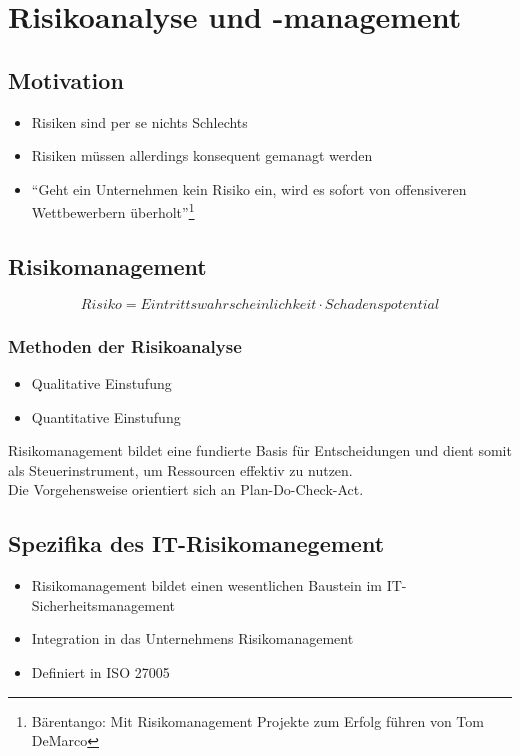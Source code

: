 \section{Risikoanalyse und -management}

\subsection{Motivation}
\begin{itemize}
	\item Risiken sind per se nichts Schlechts
	\item Risiken müssen allerdings konsequent gemanagt werden
	\item "`Geht ein Unternehmen kein Risiko ein, wird es sofort von offensiveren Wettbewerbern überholt"'\footnote{Bärentango: Mit Risikomanagement Projekte zum Erfolg führen von Tom DeMarco}
\end{itemize}


\subsection{Risikomanagement}
\[Risiko = Eintrittswahrscheinlichkeit\cdot Schadenspotential\]

\subsubsection{Methoden der Risikoanalyse}
\begin{itemize}
	\item Qualitative Einstufung
	\item Quantitative Einstufung
\end{itemize}

Risikomanagement bildet eine fundierte Basis für Entscheidungen und dient somit als Steuerinstrument, um Ressourcen effektiv zu nutzen.\\
Die Vorgehensweise orientiert sich an Plan-Do-Check-Act.

\subsection{Spezifika des IT-Risikomanegement}
\begin{itemize}
	\item Risikomanagement bildet einen wesentlichen Baustein im IT-Sicherheitsmanagement
	\item Integration in das Unternehmens Risikomanagement
	\item Definiert in ISO 27005
\end{itemize}

